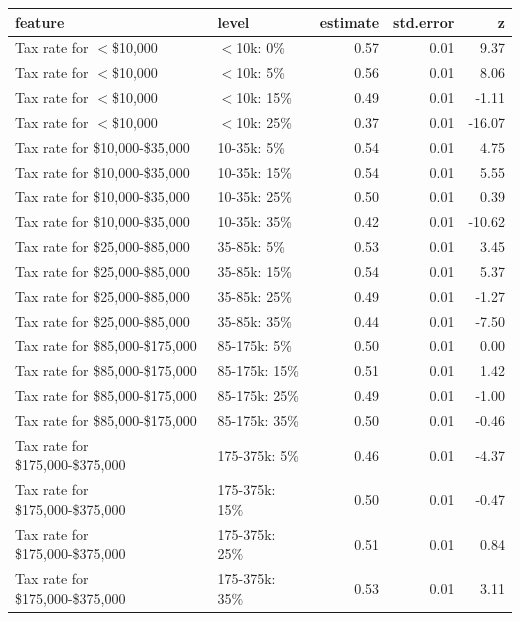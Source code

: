 \documentclass[a4paper,12pt]{article}\usepackage[]{graphicx}\usepackage[]{color}
\begin{document}
\clearpage

\begin{table}[ht]
\centering
\begin{tabular}{lp{1.5in}rrr}
  \hline
feature & level & estimate & std.error & z \\ 
  \hline
Tax rate for $<$\$10,000 & $<$10k: 0\% & 0.57 & 0.01 & 9.37 \\ 
  Tax rate for $<$\$10,000 & $<$10k: 5\% & 0.56 & 0.01 & 8.06 \\ 
  Tax rate for $<$\$10,000 & $<$10k: 15\% & 0.49 & 0.01 & -1.11 \\ 
  Tax rate for $<$\$10,000 & $<$10k: 25\% & 0.37 & 0.01 & -16.07 \\ 
  Tax rate for \$10,000-\$35,000 & 10-35k: 5\% & 0.54 & 0.01 & 4.75 \\ 
  Tax rate for \$10,000-\$35,000 & 10-35k: 15\% & 0.54 & 0.01 & 5.55 \\ 
  Tax rate for \$10,000-\$35,000 & 10-35k: 25\% & 0.50 & 0.01 & 0.39 \\ 
  Tax rate for \$10,000-\$35,000 & 10-35k: 35\% & 0.42 & 0.01 & -10.62 \\ 
  Tax rate for \$25,000-\$85,000 & 35-85k: 5\% & 0.53 & 0.01 & 3.45 \\ 
  Tax rate for \$25,000-\$85,000 & 35-85k: 15\% & 0.54 & 0.01 & 5.37 \\ 
  Tax rate for \$25,000-\$85,000 & 35-85k: 25\% & 0.49 & 0.01 & -1.27 \\ 
  Tax rate for \$25,000-\$85,000 & 35-85k: 35\% & 0.44 & 0.01 & -7.50 \\ 
  Tax rate for \$85,000-\$175,000 & 85-175k: 5\% & 0.50 & 0.01 & 0.00 \\ 
  Tax rate for \$85,000-\$175,000 & 85-175k: 15\% & 0.51 & 0.01 & 1.42 \\ 
  Tax rate for \$85,000-\$175,000 & 85-175k: 25\% & 0.49 & 0.01 & -1.00 \\ 
  Tax rate for \$85,000-\$175,000 & 85-175k: 35\% & 0.50 & 0.01 & -0.46 \\ 
  Tax rate for \$175,000-\$375,000 & 175-375k: 5\% & 0.46 & 0.01 & -4.37 \\ 
  Tax rate for \$175,000-\$375,000 & 175-375k: 15\% & 0.50 & 0.01 & -0.47 \\ 
  Tax rate for \$175,000-\$375,000 & 175-375k: 25\% & 0.51 & 0.01 & 0.84 \\ 
  Tax rate for \$175,000-\$375,000 & 175-375k: 35\% & 0.53 & 0.01 & 3.11 \\ 

\end{tabular}
\end{table}
\end{document}
